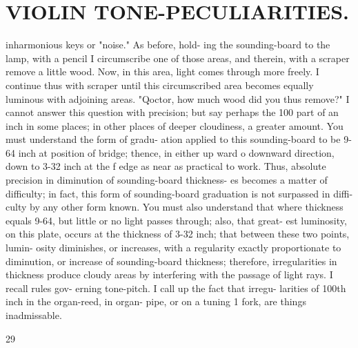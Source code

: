 \documentclass{article}
\begin{document}
\section*{VIOLIN TONE-PECULIARITIES.}
inharmonious keys or "noise." As before, hold- ing the sounding-board to the lamp, with a pencil I circumscribe one of those areas, and therein, with a scraper remove a little wood. Now, in this area, light comes through more freely. I continue thus with scraper until this circumscribed area becomes equally luminous with adjoining areas. "Qoctor, how much wood did you thus remove?" I cannot answer this question with precision; but say perhaps the 100 part of an inch in some places; in other places of deeper cloudiness, a greater amount. You must understand the form of gradu- ation applied to this sounding-board to be 9-64 inch at position of bridge; thence, in either up ward o downward direction, down to 3-32 inch at the f edge as near as practical to work. Thus, absolute precision in diminution of sounding-board thickness- es becomes a matter of difficulty; in fact, this form of sounding-board graduation is not surpassed in diffi- culty by any other form known. You must also understand that where thickness equals 9-64, but little or no light passes through; also, that great- est luminosity, on this plate, occurs at the thickness of 3-32 inch; that between these two points, lumin- osity diminishes, or increases, with a regularity exactly proportionate to diminution, or increase of sounding-board thickness; therefore, irregularities in thickness produce cloudy areas by interfering with the passage of light rays. I recall rules gov- erning tone-pitch. I call up the fact that irregu- larities of 100th inch in the organ-reed, in organ- pipe, or on a tuning 1 fork, are things inadmissable.

29
\end{document}
